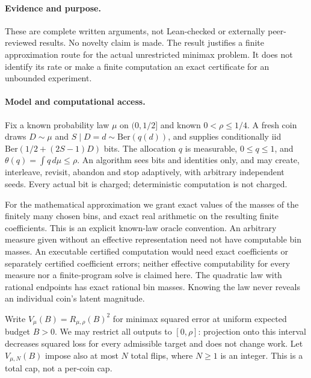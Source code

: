 
\paragraph{Evidence and purpose.}
These are complete written arguments, not Lean-checked or externally
peer-reviewed results. No novelty claim is made. The result justifies a
finite approximation route for the actual unrestricted minimax problem. It
does not identify its rate or make a finite computation an exact certificate
for an unbounded experiment.

\paragraph{Model and computational access.}
Fix a known probability law $\mu$ on $(0,1/2]$ and known $0<\rho\le1/4$.
A fresh coin draws $D\sim\mu$ and $S\mid D=d\sim\mathrm{Ber}(q(d))$, and
supplies conditionally iid $\mathrm{Ber}(1/2+(2S-1)D)$ bits. The allocation
$q$ is measurable, $0\le q\le1$, and $\theta(q)=\int q\,d\mu\le\rho$.
An algorithm sees bits and identities only, and may create, interleave,
revisit, abandon and stop adaptively, with arbitrary independent seeds.
Every actual bit is charged; deterministic computation is not charged.

For the mathematical approximation we grant exact values of the masses of
the finitely many chosen bins, and exact real arithmetic on the resulting
finite coefficients. This is an explicit known-law oracle convention.
An arbitrary measure given without an effective representation need not have
computable bin masses. An executable certified computation would need exact
coefficients or separately certified coefficient errors; neither effective
computability for every measure nor a finite-program solve is claimed here.
The quadratic law with rational endpoints has exact rational bin masses.
Knowing the law never reveals an individual coin's latent magnitude.

Write $V_\mu(B)=R_{\mu,\rho}(B)^2$ for minimax squared error at uniform
expected budget $B>0$. We may restrict all outputs to $[0,\rho]$: projection
onto this interval decreases squared loss for every admissible target and
does not change work. Let $V_{\mu,N}(B)$ impose also at most $N$ total flips,
where $N\ge1$ is an integer. This is a total cap, not a per-coin cap.

